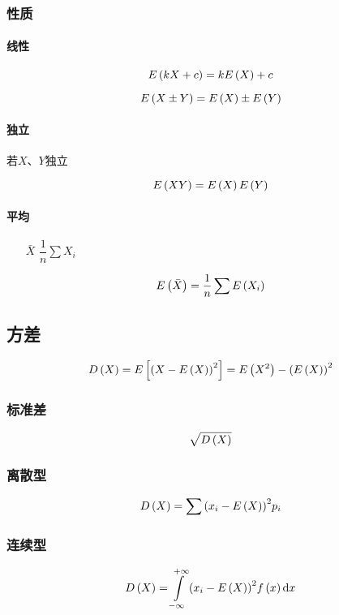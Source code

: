 \documentclass{article}
\begin{document}
\subsubsection{性质}

\paragraph{线性}

\[E\left(kX+c\right)=kE\left(X\right)+c\]

\[E\left(X\pm Y\right)=E\left(X\right)\pm E\left(Y\right)\]

\paragraph{独立}

若$X$、$Y$独立

\[E\left(XY\right)=E\left(X\right)E\left(Y\right)\]

\paragraph{平均}

\begin{enumerate}
    \item [$\bar X$]$\dfrac1n\sum X_i$
\end{enumerate}

\[E\left(\bar X\right)=\frac1n\sum E\left(X_i\right)\]

\subsection{方差}

\[D\left(X\right)=E\left[\left(X-E\left(X\right)\right)^2\right]=E\left(X^2\right)-{\left(E\left(X\right)\right)}^2\]

\subsubsection{标准差}

\[\sqrt{D\left(X\right)}\]

\subsubsection{离散型}

\[D\left(X\right)=\sum{\left(x_i-E\left(X\right)\right)}^2p_i\]

\subsubsection{连续型}

\[D\left(X\right)=\int\limits_{-\infty}^{+\infty}{\left(x_i-E\left(X\right)\right)}^2f\left(x\right)\mathrm d x\]
\end{document}
